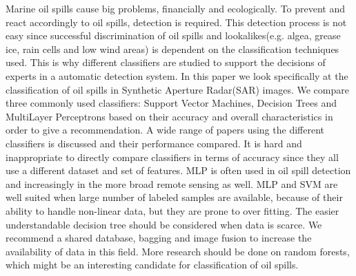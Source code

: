 Marine oil spills cause big problems, financially and ecologically. To prevent and react accordingly to oil spills, detection is required. This detection process is not easy since successful discrimination of oil spills and lookalikes(e.g. algea, grease ice, rain cells and low wind areas) is dependent on the classification techniques used. This is why different classifiers are studied to support the decisions of experts in a automatic detection system. In this paper we look specifically at the classification of oil spills in Synthetic Aperture Radar(SAR) images. We compare three commonly used classifiers: Support Vector Machines, Decision Trees and MultiLayer Perceptrons based on their accuracy and overall characteristics in order to give a recommendation. A wide range of papers using the different classifiers is discussed and their performance compared. It is hard and inappropriate to directly compare classifiers in terms of accuracy since they all use a different dataset and set of features. MLP is often used in oil spill detection and increasingly in the more broad remote sensing as well. MLP and SVM are well suited when large number of labeled samples are available, because of their ability to handle non-linear data, but they are prone to over fitting. The easier understandable decision tree should be considered when data is scarce. We recommend a shared database, bagging and image fusion to increase the availability of data in this field. More research should be done on random forests, which might be an interesting candidate for classification of oil spills.

